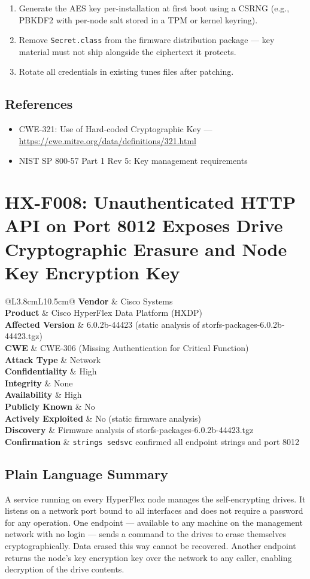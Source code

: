 \documentclass[11pt,a4paper]{article}
\makeatletter
\newcommand{\findingmeta}[9]{%
\begin{tabular}{@{}L{3.8cm}L{10.5cm}@{}}
\textbf{Vendor}             & Cisco Systems \\
\textbf{Product}            & Cisco HyperFlex Data Platform (HXDP) \\
\textbf{Affected Version}   & 6.0.2b-44423 (static analysis of storfs-packages-6.0.2b-44423.tgz) \\
\textbf{CWE}                & #1 \\
\textbf{Attack Type}        & #2 \\
\textbf{Confidentiality}    & #3 \\
\textbf{Integrity}          & #4 \\
\textbf{Availability}       & #5 \\
\textbf{Publicly Known}     & #6 \\
\textbf{Actively Exploited} & #7 \\
\textbf{Discovery}          & #8 \\
\textbf{Confirmation}       & #9 \\
\end{tabular}%
}
\makeatother
\begin{document}
\begin{enumerate}[noitemsep]
\item Generate the AES key per-installation at first boot using a CSRNG
  (e.g., PBKDF2 with per-node salt stored in a TPM or kernel keyring).
\item Remove \texttt{Secret.class} from the firmware distribution package ---
  key material must not ship alongside the ciphertext it protects.
\item Rotate all credentials in existing tunes files after patching.
\end{enumerate}

\subsection*{References}

\begin{itemize}[noitemsep]
\item CWE-321: Use of Hard-coded Cryptographic Key ---
  \url{https://cwe.mitre.org/data/definitions/321.html}
\item NIST SP 800-57 Part 1 Rev 5: Key management requirements
\end{itemize}

\bigskip

\section{HX-F008: Unauthenticated HTTP API on Port 8012 Exposes Drive Cryptographic Erasure and Node Key Encryption Key}

\findingmeta{CWE-306 (Missing Authentication for Critical Function)}{Network}{High}{None}{High}{No}{No (static firmware analysis)}{Firmware analysis of storfs-packages-6.0.2b-44423.tgz}{\texttt{strings sedsvc} confirmed all endpoint strings and port 8012}

\subsection*{Plain Language Summary}

A service running on every HyperFlex node manages the self-encrypting drives.
It listens on a network port bound to all interfaces and does not require a
password for any operation. One endpoint --- available to any machine on the
management network with no login --- sends a command to the drives to erase
themselves cryptographically. Data erased this way cannot be recovered. Another
endpoint returns the node's key encryption key over the network to any caller,
enabling decryption of the drive contents.
\end{document}
